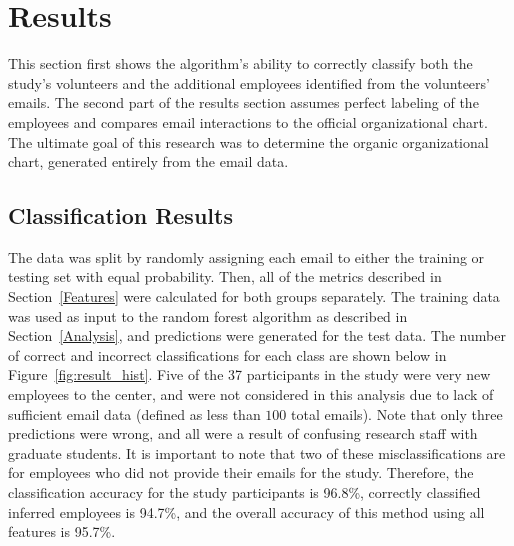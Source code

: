 \documentclass[10pt,twocolumn,conference]{IEEEtran}
\begin{document}
\section{Results} \label{Results}
This section first shows the algorithm's ability to correctly classify both the study's volunteers and the additional employees identified from the volunteers' emails.
The second part of the results section assumes perfect labeling of the employees and compares email interactions to the official organizational chart.
The ultimate goal of this research was to determine the organic organizational chart, generated entirely from the email data.

\subsection{Classification Results}\label{ssec:class_results}
The data was split by randomly assigning each email to either the training or testing set with equal probability.
Then, all of the metrics described in Section~\ref{Features} were calculated for both groups separately.
The training data was used as input to the random forest algorithm as described in Section~\ref{Analysis}, and predictions were generated for the test data.
The number of correct and incorrect classifications for each class are shown below in Figure~\ref{fig:result_hist}.
Five of the 37 participants in the study were very new employees to the center, and were not considered in this analysis due to lack of sufficient email data (defined as less than $100$ total emails).
Note that only three predictions were wrong, and all were a result of confusing research staff with graduate students.
It is important to note that two of these misclassifications are for employees who did not provide their emails for the study.
Therefore, the classification accuracy for the study participants is 96.8\%, correctly classified inferred employees is 94.7\%, and the overall accuracy of this method using all features is 95.7\%.
\end{document}
